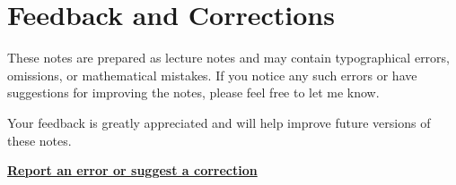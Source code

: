 \section*{Feedback and Corrections}


These notes are prepared as lecture notes and may contain typographical
errors, omissions, or mathematical mistakes. If you notice any such
errors or have suggestions for improving the notes, please feel free to
let me know.

Your feedback is greatly appreciated and will help improve future
versions of these notes.

\medskip

\noindent
\href{
https://mail.google.com/mail/u/0/?view=cm\&tf=1
\&to=kartick24@tifrbng.res.in
\&su=Correction\%20to\%20Probability\%20Notes
\&body=Lecture\%20\%2F\%20Page\%3A\%0A\%0AError\%20or\%20suggestion\%3A
}{
\textcolor{QuizBorder}{\textbf{Report an error or suggest a correction}}
}
